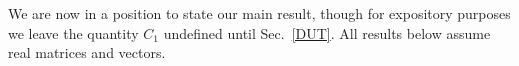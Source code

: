 \documentclass[journal, twocolumn]{IEEEtran}
\begin{document}
We are now in a position to state our main result, though for expository purposes we leave the quantity $C_1$ %
undefined until Sec.~\ref{DUT}. All results  below assume real matrices and vectors. 

\end{document}
